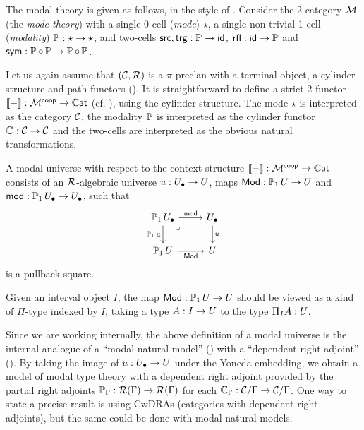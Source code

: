 The modal theory is given as follows,
in the style of \cite{licata2016,licata2017,gratzer2020}.
Consider the 2-category $\MM$ (the \emph{mode theory}) with a single 0-cell (\emph{mode}) $\star$,
a single non-trivial 1-cell (\emph{modality}) $\arr : \star \to \star$,
and two-cells $\src, \trg : \arr \to \id$,
$\rfl : \id \to \arr$ and $\sym : \arr \circ \arr \to \arr \circ \arr$.

Let us again assume that
$(\CC,\RR)$ is a $\pi$-preclan with a terminal object,
a cylinder structure and path functors ().
It is straightforward to define a strict 2-functor
$\llbracket - \rrbracket : \MM^\mathsf{coop} \to \tcat$
(cf. \cite[Definition 5.1]{gratzer2020}),
using the cylinder structure.
The mode $\star$ is interpreted as the category $\CC$,
the modality $\arr$ is interpreted as the cylinder functor $\cyl : \CC \to \CC$
and the two-cells are interpreted as the obvious natural transformations.

\begin{definition}\label{def:modal-model}
  A modal universe with respect to the context structure
  $\llbracket - \rrbracket : \MM^\mathsf{coop} \to \tcat$
  consists of an $\RR$-algebraic universe $\uu : \Ulow \to \U$,
  maps $\Mod : \arr[1] \U \to \U$ and $\mod : \arr[1] \Ulow \to \Ulow$,
  such that
  \[\begin{tikzcd}
      {\arr[1] \Ulow} & \Ulow \\
      {\arr[1] \U} & {  \U}
      \arrow["\mod", from=1-1, to=1-2]
      \arrow["{\arr[1]\uu}"', from=1-1, to=2-1]
      \arrow["\lrcorner"{anchor=center, pos=0.125}, draw=none, from=1-1, to=2-2]
      \arrow["\uu", from=1-2, to=2-2]
      \arrow["\Mod"', from=2-1, to=2-2]
  \end{tikzcd}\]
  is a pullback square.
\end{definition}
Given an interval object $I$,
the map $\Mod : \arr[1] \U \to \U$ should be viewed as
a kind of $\Pi$-type indexed by $I$,
taking a type $A : I \to \U$ to the type $\Pi_I A : \U$.

Since we are working internally,
the above definition of a modal universe is the internal analogue of a
``modal natural model'' (\cite{gratzer2020}) with a ``dependent right adjoint''
(\cite{birkedal2020}).
By taking the image of $\uu : \Ulow \to \U$ under the Yoneda embedding,
we obtain a model of modal type theory with 
a dependent right adjoint provided by the partial right adjoints
$\arr[\Gamma] : \RR(\Gamma) \to \RR(\Gamma)$
for each $\cyl[\Gamma] : \CC / \Gamma \to \CC / \Gamma$.
One way to state a precise result is using CwDRAs
(categories with dependent right adjoints),
but the same could be done with modal natural models.

